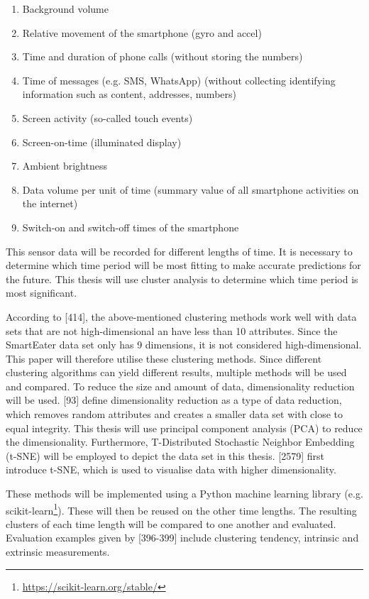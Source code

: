 \documentclass[12pt,a4paper]{article}
\begin{document}
\begin{enumerate}
	\item Background volume
	\item Relative movement of the smartphone (gyro and accel)
	\item Time and duration of phone calls (without storing the numbers)
	\item Time of messages (e.g. SMS, WhatsApp) (without collecting identifying information such as content, addresses, numbers)
	\item Screen activity (so-called touch events)
	\item Screen-on-time (illuminated display)
	\item Ambient brightness
	\item Data volume per unit of time (summary value of all smartphone activities on the internet)
	\item Switch-on and switch-off times of the smartphone
\end{enumerate}



This sensor data will be recorded for different lengths of time. It is necessary to determine which time period will be most fitting to make accurate predictions for the future. This thesis will use cluster analysis to determine which time period is most significant.

According to \textcite{han2011data}[414], the above-mentioned clustering methods work well with data sets that are not high-dimensional an have less than 10 attributes. Since the SmartEater data set only has 9 dimensions, it is not considered high-dimensional. This paper will therefore utilise these clustering methods. Since different clustering algorithms can yield different results, multiple methods will be used and compared.
To reduce the size and amount of data, dimensionality reduction will be used. \textcite{han2011data}[93] define dimensionality reduction as a type of data reduction, which removes random attributes and creates a smaller data set with close to equal integrity. This thesis will use principal component analysis (PCA) to reduce the dimensionality.
Furthermore, T-Distributed Stochastic Neighbor Embedding (t-SNE) will be employed to depict the data set in this thesis. \textcite{maaten2008visualizing}[2579] first introduce t-SNE, which is used to visualise data with higher dimensionality. 

These methods will be implemented using a Python machine learning library (e.g. scikit-learn\footnote{\url{https://scikit-learn.org/stable/}}). These will then be reused on the other time lengths. The resulting clusters of each time length will be compared to one another and evaluated. Evaluation examples given by \textcite{han2011data}[396-399] include clustering tendency, intrinsic and extrinsic measurements. 
\end{document}
